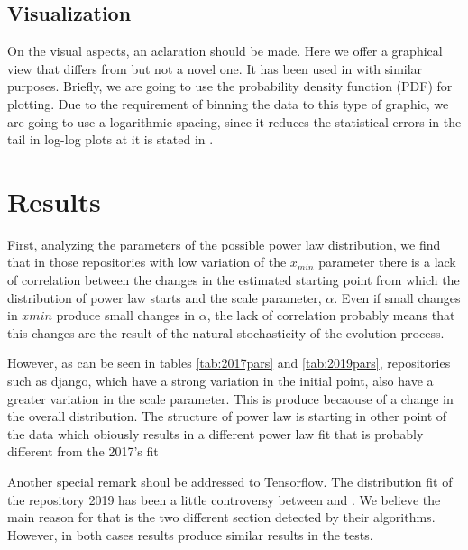 \documentclass[conference]{IEEEtran}
\begin{document}
\subsection{Visualization}
 
On the visual aspects, an aclaration should be made. Here we offer a graphical view that differs from \cite{merelo2017self}
but not a novel one. It has been used in \cite{arafat2009commit} with similar purposes. 
Briefly, we are going to use the probability density function (PDF) for plotting. Due to the 
requirement of binning the data to this type of graphic, we are going to use a
logarithmic spacing, since it reduces the statistical errors in the tail in log-log 
plots at it is stated in \cite{newman2005power}.




\section{Results}
\label{res}
First, analyzing the parameters of the possible power law distribution, we find that in those repositories with low variation of the $x_{min}$ parameter there is a lack of correlation between the changes in the estimated starting point from which the distribution of power law starts and the scale parameter, $\alpha$. Even if small changes in $xmin$ produce small changes in $\alpha$, the lack of correlation probably means that this changes 
are the result of the natural stochasticity of the evolution process.  %

However, as can be seen in tables \ref{tab:2017pars} and \ref{tab:2019pars}, repositories such as django, which have a strong variation in the initial point, also have a greater variation in the scale parameter. This is produce becaouse of a change in the overall distribution. The structure of power law is starting in other point of the data which obiously results in a different power law fit that is probably different from the 2017's fit  %


Another special remark shoul be addressed to Tensorflow. The distribution fit of the repository 2019 has been a little controversy between \cite{alstott2014powerlaw} and \cite{gillespie2015power}. We believe the main reason for that is the two different section detected by their algorithms. However, in both cases results produce similar results in the tests.
\end{document}

